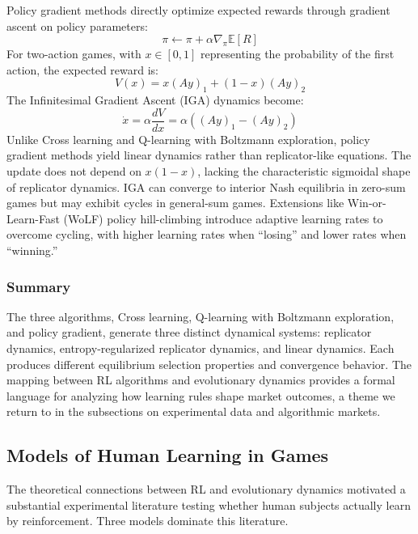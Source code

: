 Policy gradient methods directly optimize expected rewards through gradient ascent on policy parameters:
\begin{equation}
\pi \leftarrow \pi + \alpha\nabla_{\pi}\mathbb{E}[R]
\end{equation}
For two-action games, with $x \in [0,1]$ representing the probability of the first action, the expected reward is:
\begin{equation}
V(x) = x(Ay)_1 + (1-x)(Ay)_2
\end{equation}
The Infinitesimal Gradient Ascent (IGA) dynamics become:
\begin{equation}
\dot{x} = \alpha\frac{dV}{dx} = \alpha((Ay)_1 - (Ay)_2)
\end{equation}
Unlike Cross learning and Q-learning with Boltzmann exploration, policy gradient methods yield linear dynamics rather than replicator-like equations. The update does not depend on $x(1-x)$, lacking the characteristic sigmoidal shape of replicator dynamics. IGA can converge to interior Nash equilibria in zero-sum games \citep{singh2000} but may exhibit cycles in general-sum games. Extensions like Win-or-Learn-Fast (WoLF) policy hill-climbing \citep{BowlingVeloso2002} introduce adaptive learning rates to overcome cycling, with higher learning rates when ``losing'' and lower rates when ``winning.''

\subsubsection{Summary}

The three algorithms, Cross learning, Q-learning with Boltzmann exploration, and policy gradient, generate three distinct dynamical systems: replicator dynamics, entropy-regularized replicator dynamics, and linear dynamics. Each produces different equilibrium selection properties and convergence behavior. The mapping between RL algorithms and evolutionary dynamics provides a formal language for analyzing how learning rules shape market outcomes, a theme we return to in the subsections on experimental data and algorithmic markets.

\subsection{Models of Human Learning in Games}

The theoretical connections between RL and evolutionary dynamics motivated a substantial experimental literature testing whether human subjects actually learn by reinforcement. Three models dominate this literature.

